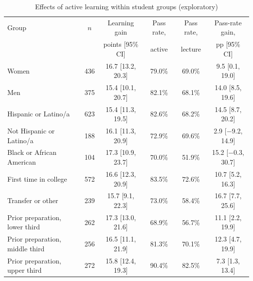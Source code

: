 \begin{table}[h!]
\centering\small\setlength{\tabcolsep}{5pt}
\caption{Effects of active learning within student groups (exploratory)}
\label{tab:subgroups}
\begin{tabular}{lccccc}
\toprule
Group & $n$ & Learning gain & Pass rate, & Pass rate, & Pass-rate gain, \\
 & & points [95\% CI] & active & lecture & pp [95\% CI] \\
\midrule
Women & 436 & 16.7 [13.2, 20.3] & 79.0\% & 69.0\% & 9.5 [0.1, 19.0] \\
Men & 375 & 15.4 [10.1, 20.7] & 82.1\% & 68.1\% & 14.0 [8.5, 19.6] \\
Hispanic or Latino/a & 623 & 15.4 [11.3, 19.5] & 82.6\% & 68.2\% & 14.5 [8.7, 20.2] \\
Not Hispanic or Latino/a & 188 & 16.1 [11.3, 20.9] & 72.9\% & 69.6\% & 2.9 [$-$9.2, 14.9] \\
Black or African American & 104 & 17.3 [10.9, 23.7] & 70.0\% & 51.9\% & 15.2 [$-$0.3, 30.7] \\
First time in college & 572 & 16.6 [12.3, 20.9] & 83.5\% & 72.6\% & 10.7 [5.2, 16.3] \\
Transfer or other & 239 & 15.7 [9.1, 22.3] & 73.0\% & 58.4\% & 16.7 [7.7, 25.6] \\
Prior preparation, lower third & 262 & 17.3 [13.0, 21.6] & 68.9\% & 56.7\% & 11.1 [2.2, 19.9] \\
Prior preparation, middle third & 256 & 16.5 [11.1, 21.9] & 81.3\% & 70.1\% & 12.3 [4.7, 19.9] \\
Prior preparation, upper third & 272 & 15.8 [12.4, 19.3] & 90.4\% & 82.5\% & 7.3 [1.3, 13.4] \\
\bottomrule
\end{tabular}
\end{table}
